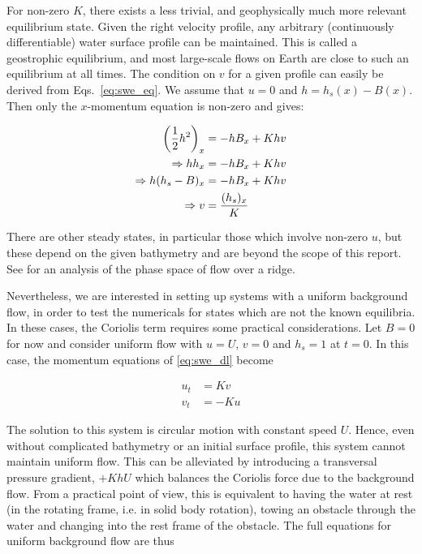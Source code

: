 For non-zero $K$, there exists a less trivial, and geophysically much more relevant equilibrium state. Given the right velocity profile, any arbitrary (continuously differentiable) water surface profile can be maintained. This is called a geostrophic equilibrium, and most large-scale flows on Earth are close to such an equilibrium at all times. The condition on $v$ for a given profile can easily be derived from Eqs.~\ref{eq:swe_eq}. We assume that $u = 0$ and $h = h_s(x) - B(x)$. Then only the $x$-momentum equation is non-zero and gives:

\begin{align}
  \qty(\frac{1}{2}h^2)_x &= -hB_x + Khv \\
  \Rightarrow h h_x &= -hB_x + Khv \\
  \Rightarrow h (h_s - B)_x &= -hB_x + Khv \\
  \Rightarrow v &= \frac{(h_s)_x}{K} \label{eq:geo_eq}
\end{align}

There are other steady states, in particular those which involve non-zero $u$, but these depend on the given bathymetry and are beyond the scope of this report. See \citet{esler2005steady} for an analysis of the phase space of flow over a ridge.

Nevertheless, we are interested in setting up systems with a uniform background flow, in order to test the numericals for states which are not the known equilibria. In these cases, the Coriolis term requires some practical considerations. Let $B = 0$ for now and consider uniform flow with $u = U$, $v = 0$ and $h_s = 1$ at $t = 0$. In this case, the momentum equations of \ref{eq:swe_dl} become

\begin{align}
  u_t &= Kv \\
  v_t &= -Ku
\end{align}

The solution to this system is circular motion with constant speed $U$. Hence, even without complicated bathymetry or an initial surface profile, this system cannot maintain uniform flow. This can be alleviated by introducing a transversal pressure gradient, $+KhU$ which balances the Coriolis force due to the background flow. From a practical point of view, this is equivalent to having the water at rest (in the rotating frame, i.e. in solid body rotation), towing an obstacle through the water and changing into the rest frame of the obstacle. The full equations for uniform background flow are thus

